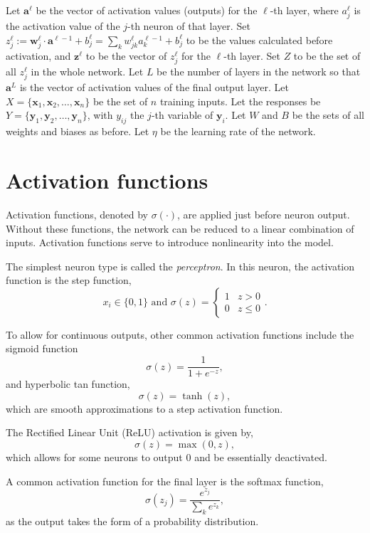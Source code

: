 Let $\mathbf{a}^\ell$ be the vector of activation values (outputs) for the $\ell$-th layer, where $a_j^\ell$ is the activation value of the $j$-th neuron of that layer. Set $z_j^\ell := \mathbf{w}_j^\ell\cdot \mathbf{a}^{\ell-1} + b_j^\ell= \sum_k w_{jk}^\ell a_k^{\ell-1} + b_j^\ell$ to be the values calculated before activation, and $\mathbf{z}^\ell$ to be the vector of $z_j^\ell$ for the $\ell$-th layer. Set $Z$ to be the set of all $z_j^\ell$ in the whole network. Let $L$ be the number of layers in the network so that $\mathbf{a}^L$ is the vector of activation values of the final output layer. Let $X = \{\mathbf{x}_1, \mathbf{x}_2, \ldots, \mathbf{x}_n\}$ be the set of $n$ training inputs. Let the responses be $Y = \{\mathbf{y}_1, \mathbf{y}_2, \ldots, \mathbf{y}_n\}$, with $y_{ij}$ the $j$-th variable of $\mathbf{y}_i$. Let $W$ and $B$ be the sets of all weights and biases as before. Let $\eta$ be the learning rate of the network. 

\section{Activation functions}\label{nnets-act}

Activation functions, denoted by $\sigma(\cdot)$, are applied just before neuron output. Without these functions, the network can be reduced to a linear combination of inputs. Activation functions serve to introduce nonlinearity into the model.

The simplest neuron type is called the \textit{perceptron}. In this neuron, the activation function is the step function,
\[
	x_i \in \{0,1\} \text{ and } \sigma(z) = \begin{cases}
		1 & z > 0 \\
		0 & z \le 0
	\end{cases}.
\]

To allow for continuous outputs, other common activation functions include the sigmoid function
\[
	\sigma(z) = \dfrac{1}{1+e^{-z}},
\]
and hyperbolic tan function,
\[
	\sigma(z) = \tanh(z),
\]
which are smooth approximations to a step activation function.

The Rectified Linear Unit (ReLU) activation is given by,
\[
	\sigma(z) = \max(0, z),
\]
which allows for some neurons to output 0 and be essentially deactivated.

A common activation function for the final layer is the softmax function,
\[
	\sigma(z_j) = \dfrac{e^{z_j}}{\sum_ke^{z_k}},
\]
as the output takes the form of a probability distribution.


